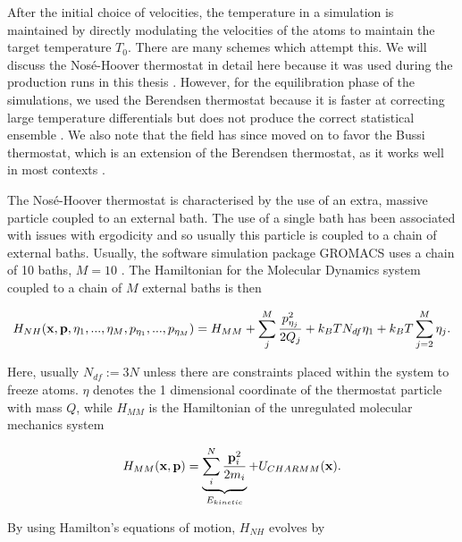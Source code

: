 After the initial choice of velocities, the temperature in a simulation is maintained by directly modulating the velocities of the atoms to maintain the target temperature $T_0$. There are many schemes which attempt this. We will discuss the Nos\'e-Hoover thermostat in detail here because it was used during the production runs in this thesis  \cite{nose1984, hoover1985, martyna1992}. However, for the equilibration phase of the simulations, we used the Berendsen thermostat because it is faster at correcting large temperature differentials but does not produce the correct statistical ensemble \cite{bussi2007, berendsen1984}. We also note that the field has since moved on to favor the Bussi thermostat, which is an extension of the Berendsen thermostat, as it works well in most contexts  \cite{bussi2007, braun2019}.

The Nos\'e-Hoover thermostat is characterised by the use of an extra, massive particle coupled to an external bath. The use of a single bath has been associated with issues with ergodicity and so usually this particle is coupled to a chain of external baths. Usually, the software simulation package GROMACS uses a chain of 10 baths, $M=10$ \cite{martyna1992, martyna1996, abraham2015}. The Hamiltonian for the Molecular Dynamics system coupled to a chain of $M$ external baths is then

\begin{equation}
	H_{NH} (\bold{x},\bold{p},\eta_1 , ... , \eta_M, p_{\eta_1}, ...,  p_{\eta_M}  )= H_{MM} + \sum_j^M \frac{p^2_{\eta_j}}{2Q_j} +k_BT  N_{df}   \eta_1   + k_BT \sum_{j=2}^M\eta_j.
\end{equation}

Here, usually $N_{df} := 3N$ unless there are constraints placed within the system to freeze atoms. $\eta$ denotes the 1 dimensional coordinate of the thermostat particle with mass $Q$, while $H_{MM}$ is the Hamiltonian of the unregulated molecular mechanics system 

\begin{equation}
H_{MM}(\bold{x},\bold{p}) = \underbrace{\sum_i^N \frac{\bold{p}_i^2}{2 m_i}}_{E_{kinetic}} + U_{CHARMM} (\bold{x}). 
\end{equation}

By using Hamilton's equations of motion, $H_{NH}$ evolves by

